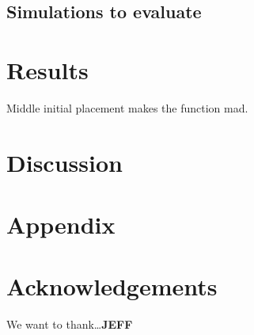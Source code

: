 \documentclass[submit]{smj}
\begin{document}
\subsection{Simulations to evaluate}

\section{Results}

Middle initial placement makes the function mad. 

\section{Discussion}

\section{Appendix}
\section*{Acknowledgements}
We want to thank\ldots \textbf{JEFF}



\end{document}
